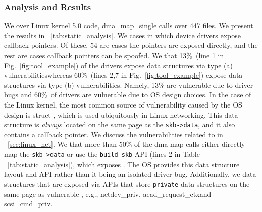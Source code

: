 \subsubsection{Analysis and Results}
We \DIFdelbegin {}\DIFdelend \DIFaddbegin {}\DIFaddend \tool over Linux kernel 5.0 code,
\DIFdelbegin {}\DIFdelend \DIFaddbegin {} dma\_map\_single calls over 447 files. We present the results in \DIFdelbegin {}\DIFdelend \DIFaddbegin {}\DIFaddend ~\ref{tab:static_analysis}. 
We \DIFdelbegin {}\DIFdelend \DIFaddbegin {} cases in which device drivers expose callback pointers. Of these, 54 are cases \DIFdelbegin {}\DIFdelend \DIFaddbegin {}\DIFaddend the pointers are exposed directly, and the rest are cases \DIFdelbegin {}\DIFdelend \DIFaddbegin {}\DIFaddend callback pointers can be spoofed.
We \DIFdelbegin {}\DIFdelend \DIFaddbegin {}\DIFaddend that 13\%~(line 1 in Fig.~\ref{fig:tool_example}) of the drivers expose data structures via type (a) vulnerabilities\DIFaddbegin \DIFadd{, }\DIFaddend whereas 60\%~(lines 2,7 in Fig.~\ref{fig:tool_example}) expose data structures via type (b) vulnerabilities. Namely, 13\% are vulnerable due to driver bugs and 60\%~of drivers are vulnerable due to OS design choices. In the case of the Linux kernel, the most common source of vulnerability caused by the OS design is struct \shinfo, which is used ubiquitously in Linux networking. This data structure is \textit{always} located on the same page as the \texttt{skb->data}, and it also contains a callback pointer. We discuss the vulnerabilities related to \shinfo in \DIFdelbegin {}\DIFdelend \DIFaddbegin {}\DIFaddend ~\ref{sec:linux_net}. We \DIFdelbegin {}\DIFdelend \DIFaddbegin {}\DIFaddend that more than 50\% of the dma-map calls either directly map the \texttt{skb->data} or use the \texttt{build\_skb} API (lines 2 \DIFdelbegin \DIFdel{\& }\DIFdelend \DIFaddbegin {} in Table ~\ref{tab:static_analysis}), which exposes \shinfo. The OS provides this data structure layout and API rather than it being an isolated driver bug. Additionally, we \DIFdelbegin {}\DIFdelend \DIFaddbegin {} data structures that are exposed via APIs that store \texttt{private} data structures on the same page as vulnerable \DIFdelbegin {}\DIFdelend \DIFaddbegin {}\DIFaddend , e.g., netdev\_priv, aead\_request\_ctx\DIFaddbegin \DIFadd{, }\DIFaddend and scsi\_cmd\_priv.

